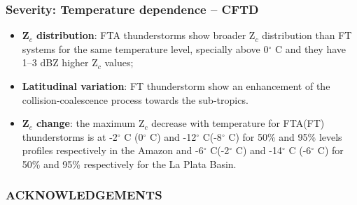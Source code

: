 \documentclass[smaller]{beamer}
\begin{document}
\begin{frame}
\frametitle{Severity: Temperature dependence -- CFTD}
\begin{itemize}
\item \textbf{Z$_c$ distribution}: FTA thunderstorms show broader Z$_c$ distribution than FT systems for the same temperature level, specially above 0$^{\circ}$ C and they have 1--3 dBZ higher Z$_c$ values;
\item \textbf{Latitudinal variation}: FT thunderstorm show an enhancement of the collision-coalescence process towards the sub-tropics.
\item  \textbf{Z$_c$ change}: the maximum Z$_c$ decrease with temperature for FTA(FT) thunderstorms is at -2$^{\circ}$ C (0$^{\circ}$ C) and -12$^{\circ}$ C(-8$^{\circ}$ C) for 50\% and 95\% levels profiles respectively in the Amazon and -6$^{\circ}$ C(-2$^{\circ}$ C) and -14$^{\circ}$ C (-6$^{\circ}$ C) for 50\% and 95\% respectively for the La Plata Basin.
\end{itemize}

\end{frame}


\begin{frame}
\frametitle{ACKNOWLEDGEMENTS}

\end{frame}
\end{document}
